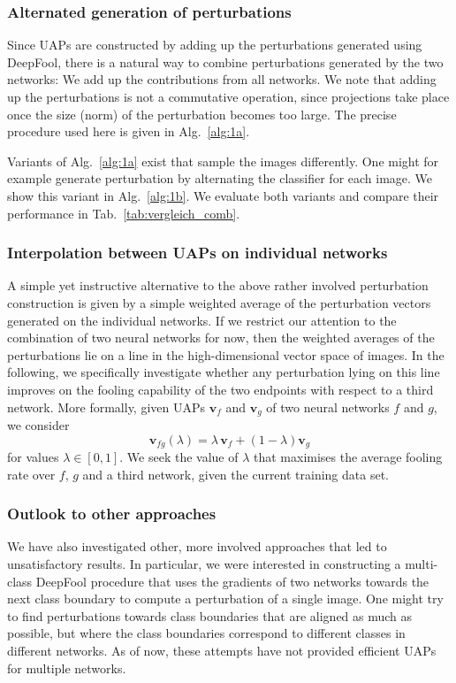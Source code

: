 \documentclass[runningheads]{llncs}
\begin{document}
\subsubsection{Alternated generation of perturbations}
Since UAPs are constructed by adding up the perturbations generated using DeepFool, there is a natural way to combine perturbations generated by the two networks: We add up the contributions from all networks. We note that adding up the perturbations is not a commutative operation, since projections take place once the size (norm) of the perturbation becomes too large. The precise procedure used here is given in Alg.~\ref{alg:1a}. 

Variants of Alg.~\ref{alg:1a} exist that sample the images differently. One might for example generate perturbation by alternating the classifier for each image. We show this variant in Alg.~\ref{alg:1b}. We evaluate both variants and compare their performance in Tab.~\ref{tab:vergleich_comb}. 
 
\subsubsection{Interpolation between UAPs on individual networks}
A simple yet instructive alternative to the above rather involved perturbation construction is given by a simple weighted average of the perturbation vectors generated on the individual networks. If we restrict our attention to the combination of two neural networks for now, then the weighted averages of the perturbations lie on a line in the high-dimensional vector space of images. In the following, we specifically investigate whether any perturbation lying on this line improves on the fooling capability of the two endpoints with respect to a third network.
More formally, given UAPs \(\mathbf{v}_f\) and \(\mathbf{v}_g\) of two neural networks $f$ and $g$, we consider \begin{equation}\label{eq:interp}
\mathbf{v}_{fg}\left(\lambda\right)=\lambda\,\mathbf{v}_f+\left(1-\lambda\right)\mathbf{v}_g
\end{equation}	
for values \(\lambda\in\left[0,1\right]\). We seek the value of $\lambda$ that maximises the average fooling rate over $f$, $g$ and a third network, given the current training data set.


\subsubsection{Outlook to other approaches}
We have also investigated other, more involved approaches that led to unsatisfactory results. In particular, we were interested in constructing a multi-class DeepFool procedure that uses the gradients of two networks towards the next class boundary to compute a perturbation of a single image. One might try to find perturbations towards class boundaries that are aligned as much as possible, but where the class boundaries correspond to different classes in different networks. As of now, these attempts have not provided efficient UAPs for multiple networks.
\end{document}
